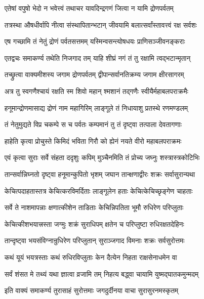 \twolineshloka
{एतेषां वपुषो भेदो न भवेत्त्वं तथाचर}
{यावदिन्द्रगणं जित्वा न यामि द्रोणपर्वतम्}%

\twolineshloka
{तत्रस्था औषधीर्वापि नीत्वा संस्थापितान्भटान्}
{जीवयामि बलात्सर्वांस्तावत्त्वं रक्ष सर्वशः}%

\twolineshloka
{एष गच्छामि तं नेतुं द्रोणं पर्वतसत्तमम्}
{यस्मिन्वसन्त्योषधयः प्राणिसञ्जीवनङ्कराः}%

\twolineshloka
{एतद्वचः समाकर्ण्य तथेति निजगाद तम्}
{याहि शीघ्रं नगं तं तु रक्षामि त्वद्भटान्मृतान्}%

\twolineshloka
{तच्छ्रुत्वा वाक्यमीशस्य जगाम द्रोणपर्वतम्}
{द्वीपान्सर्वानतिक्रम्य जगाम क्षीरसागरम्}%

\twolineshloka
{अत्र तु स्वगणैश्चायं रक्षति स्म शिवो महान्}
{श्मशानं तद्गणैः स्वीयैर्महाबलपराक्रमैः}%

\twolineshloka
{हनूमान्द्रोणमासाद्य द्रोणं नाम महागिरिम्}
{लाङ्गूले तं निधायाशु प्रतस्थे रणमण्डलम्}%

\twolineshloka
{तं नेतुमुद्यते विप्र चकम्पे स च पर्वतः}
{कम्पमानं तु तं दृष्ट्वा तत्पाला देवतागणाः}%

\twolineshloka
{हाहेति कृत्वा प्रोचुस्ते किमिदं भविता गिरौ}
{को ह्येनं नयते वीरो महाबलपराक्रमः}%

\twolineshloka
{एवं कृत्वा सुराः सर्वे संहता ददृशुः कपिम्}
{मुञ्चैनमिति तं प्रोच्य जघ्नुः शस्त्रास्त्रकोटिभिः}%

\twolineshloka
{तान्सर्वान्निघ्नतो दृष्ट्वा हनूमान्कुपितो भृशम्}
{जघान तान्क्षणाद्वीरः शक्रः सर्वासुरान्यथा}%

\twolineshloka
{केचित्पदाहतास्तत्र केचित्करविमर्दिताः}
{लाङ्गूलेन हताः केचित्केचिच्छृङ्गेण चाहताः}%

\twolineshloka
{सर्वे ते नाशमापन्नाः क्षणात्कीशेन ताडिताः}
{केचिन्निपतिता भूमौ रुधिरेण परिप्लुताः}%

\twolineshloka
{केचित्कीशभयात्त्रस्ता जग्मुः शक्रं सुराधिपम्}
{क्षतेन च परिप्लुष्टा रुधिरक्षतदेहिनः}%

\twolineshloka
{तान्दृष्ट्वा भयसंविग्नान्रुधिरेण परिप्लुतान्}
{सुराञ्जगाद विमनाः शक्रः सर्वसुरोत्तमः}%

\twolineshloka
{कथं यूयं भयत्रस्ताः कथं रुधिरविप्लुताः}
{केन दैत्येन निहता राक्षसेनाधमेन वा}%

\twolineshloka
{सर्वं शंसत मे तथ्यं यथा ज्ञात्वा व्रजामि तम्}
{निहत्य बद्ध्वा चायामि युष्मद्घातकमुन्मदम्}%

\twolineshloka
{इति वाक्यं समाकर्ण्य तुरासाहं सुरोत्तमाः}
{जगदुर्दीनया वाचा सुरासुरनमस्कृतम्}%

